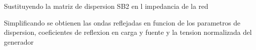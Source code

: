\documentclass{article}
\begin{document}
\begin{Maple Normal}{
\begin{Maple Normal}{
}\end{Maple Normal}
}\end{Maple Normal}
\begin{Maple Normal}{
\begin{Maple Normal}{
Sustituyendo la matriz de dispersion SB2 en l impedancia de la red}\end{Maple Normal}

}\end{Maple Normal}

\begin{maplegroup}
\mapleresult
\begin{maplelatex}
\end{maplelatex}
\end{maplegroup}
\begin{Maple Normal}{
\begin{Maple Normal}{
Simplificando se obtienen las ondas reflejadas en funcion de los parametros de dispersion, coeficientes de reflexion en carga y fuente y la tension normalizada del generador}\end{Maple Normal}

}\end{Maple Normal}
\end{document}
